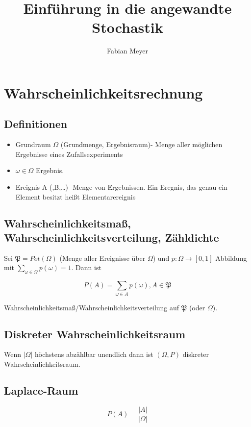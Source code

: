 \documentclass{scrartcl}%
\begin{document}
\title{Einführung in die angewandte Stochastik}%
\author{Fabian Meyer}
\maketitle%
\tableofcontents
\newpage
\section{Wahrscheinlichkeitsrechnung}

\subsection{Definitionen}

\begin{itemize}
	\item{Grundraum $\Omega$ (Grundmenge, Ergebnisraum)- Menge aller möglichen Ergebnisse eines Zufallsexperiments}
	\item{$\omega \in \Omega$ Ergebnis.}
	\item{Ereignis A (,B,\ldots)- Menge von Ergebnissen. Ein Eregnis, das genau ein Element besitzt heißt Elementarereignis}
\end{itemize}


\subsection{Wahrscheinlichkeitsmaß, Wahrscheinlichkeitsverteilung, Zähldichte}
Sei $\mathfrak{P} = Pot(\Omega)$ (Menge aller Ereignisse über $\Omega$) und $p: \Omega \rightarrow [0,1]$ Abbildung mit $\sum_{\omega \in \Omega} p(\omega) = 1$. Dann ist 

\[P(A) = \sum_{\omega \in A} p(\omega), A \in \mathfrak{P}\]

Wahrscheinlichkeitsmaß/Wahrscheinlichkeitsverteilung auf $\mathfrak{P}$ (oder $\Omega$).

\subsection{Diskreter Wahrscheinlichkeitsraum}
Wenn $\vert \Omega\vert$ höchstens abzählbar unendlich dann ist $(\Omega, P)$ diskreter Wahrscheinlichkeitsraum.

\subsection{Laplace-Raum}
\[P(A) = \frac{\vert A\vert}{\vert \Omega\vert}\]
\end{document}
